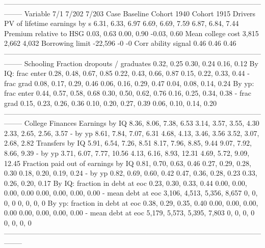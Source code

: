 --------------------------------------------------------------------------------------------------------------------
                              Variable                         7/1                    7/202                    7/203
                                  Case                    Baseline              Cohort 1940              Cohort 1915
                               Drivers                                                                              
          PV of lifetime earnings by s            6.31, 6.33, 6.97         6.69, 6.69, 7.59         6.87, 6.84, 7.44
               Premium relative to HSG                  0.03, 0.63               0.00, 0.90              -0.03, 0.60
                     Mean college cost                       3,815                    2,662                    4,032
                       Borrowing limit                     -22,596                       -0                       -0
                   Corr ability signal                        0.46                     0.46                     0.46
--------------------------------------------------------------------------------------------------------------------
                             Schooling                                                                              
         Fraction dropouts / graduates                  0.32, 0.25               0.30, 0.24               0.16, 0.12
                     By IQ: frac enter      0.28, 0.48, 0.67, 0.85   0.22, 0.43, 0.66, 0.87   0.15, 0.22, 0.33, 0.44
                           - frac grad      0.08, 0.17, 0.29, 0.46   0.06, 0.16, 0.29, 0.47   0.04, 0.08, 0.14, 0.24
                     By yp: frac enter      0.44, 0.57, 0.58, 0.68   0.30, 0.50, 0.62, 0.76   0.16, 0.25, 0.34, 0.38
                           - frac grad      0.15, 0.23, 0.26, 0.36   0.10, 0.20, 0.27, 0.39   0.06, 0.10, 0.14, 0.20
--------------------------------------------------------------------------------------------------------------------
                      College Finances                                                                              
                        Earnings by IQ      8.36, 8.06, 7.38, 6.53   3.14, 3.57, 3.55, 4.30   2.33, 2.65, 2.56, 3.57
                               - by yp      8.61, 7.84, 7.07, 6.31   4.68, 4.13, 3.46, 3.56   3.52, 3.07, 2.68, 2.82
                       Transfers by IQ      5.91, 6.54, 7.26, 8.51   8.17, 7.96, 8.85, 9.44   9.07, 7.92, 8.66, 9.39
                               - by yp     3.71, 6.07, 7.77, 10.56  4.13, 6.16, 8.93, 12.31  4.69, 5.72, 9.09, 12.45
   Fraction paid out of earnings by IQ      0.81, 0.70, 0.63, 0.46   0.27, 0.29, 0.28, 0.30   0.18, 0.20, 0.19, 0.24
                               - by yp      0.82, 0.69, 0.60, 0.42   0.47, 0.36, 0.28, 0.23   0.33, 0.26, 0.20, 0.17
        By IQ: fraction in debt at eoc      0.23, 0.30, 0.33, 0.44   0.00, 0.00, 0.00, 0.00   0.00, 0.00, 0.00, 0.00
                    - mean debt at eoc  3,106, 4,513, 5,356, 8,657               0, 0, 0, 0               0, 0, 0, 0
        By yp: fraction in debt at eoc      0.38, 0.29, 0.35, 0.40   0.00, 0.00, 0.00, 0.00   0.00, 0.00, 0.00, 0.00
                    - mean debt at eoc  5,179, 5,573, 5,395, 7,803               0, 0, 0, 0               0, 0, 0, 0
--------------------------------------------------------------------------------------------------------------------
